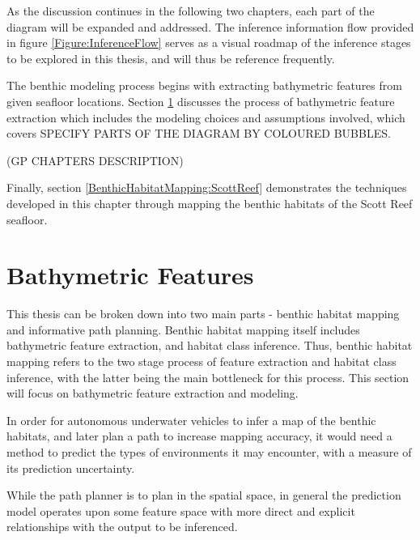 	As the discussion continues in the following two chapters, each part of the diagram will be expanded and addressed. The inference information flow provided in figure \ref{Figure:InferenceFlow} serves as a visual roadmap of the inference stages to be explored in this thesis, and will thus be reference frequently.
		
	 The benthic modeling process begins with extracting bathymetric features from given seafloor locations. Section \ref{BenthicHabitatMapping:BathymetricFeatures} discusses the process of bathymetric feature extraction which includes the modeling choices and assumptions involved, which covers {\color{BurntOrange} SPECIFY PARTS OF THE DIAGRAM BY COLOURED BUBBLES}. 
	 
	 (GP CHAPTERS DESCRIPTION)
	 
	 Finally, section \ref{BenthicHabitatMapping:ScottReef} demonstrates the techniques developed in this chapter through mapping the benthic habitats of the Scott Reef seafloor. 
		
	\section{Bathymetric Features}
	\label{BenthicHabitatMapping:BathymetricFeatures}
	
		This thesis can be broken down into two main parts - benthic habitat mapping and informative path planning. Benthic habitat mapping itself includes bathymetric feature extraction, and habitat class inference. Thus, benthic habitat mapping refers to the two stage process of feature extraction and habitat class inference, with the latter being the main bottleneck for this process. This section will focus on bathymetric feature extraction and modeling.
			
		In order for autonomous underwater vehicles to infer a map of the benthic habitats, and later plan a path to increase mapping accuracy, it would need a method to predict the types of environments it may encounter, with a measure of its prediction uncertainty.
		
		While the path planner is to plan in the spatial space, in general the prediction model operates upon some feature space with more direct and explicit relationships with the output to be inferenced.
		
